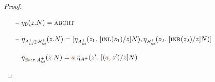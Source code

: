 \begin{proof}
\begin{itemize}
\item[--] $\etapa{z}{N}{\zero} = \tabort$ 

\item[--] $\etapa{z}{N}{A^+_\mlvl \oplus B^+_\mlvl} = 
           \toplusl
            {\etapa{z_1}{~[\tinl{z_1}/z]N}{A^+_\mlvl}}
            {\etapa{z_2}{~[\tinr{z_2}/z]N}{B^+_\mlvl}}$




\item[--] $\etapa{z}{N}{\exists \lf a{:}\tau. A^+_\mlvl} 
           = \texistsl{\lf a}
              {\etapa{z'}
                {~[(\texistsr{\lf a}{z'})/z]N}
                {A^+}}$ 



\end{itemize}
\end{proof}
